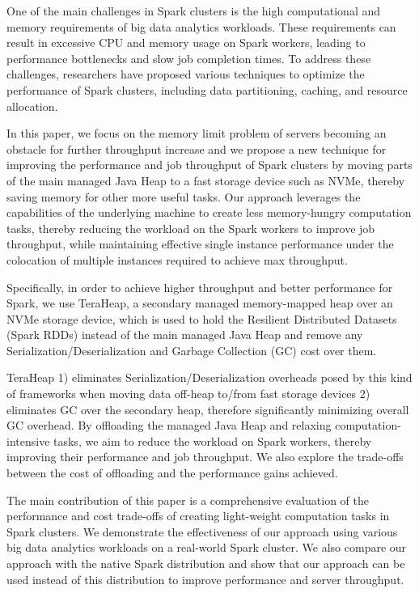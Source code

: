 \documentclass[twocolumn,10pt]{asme2e}
\begin{document}
One of the main challenges in Spark clusters is the high computational and memory requirements of big data analytics workloads. These requirements can result in excessive CPU and memory usage on Spark workers, leading to performance bottlenecks and slow job completion times. To address these challenges, researchers have proposed various techniques to optimize the performance of Spark clusters, including data partitioning, caching, and resource allocation.

In this paper, we focus on the memory limit problem of servers becoming an obstacle for further throughput increase and we propose a new technique for improving the performance and job throughput of Spark clusters by moving parts of the main managed Java Heap to a fast storage device such as NVMe, thereby saving memory for other more useful tasks. Our approach leverages the capabilities of the underlying machine to create less memory-hungry computation tasks, thereby reducing the workload on the Spark workers to improve job throughput, while maintaining effective single instance performance under the colocation of multiple instances required to achieve max throughput.

Specifically, in order to achieve higher throughput and better performance for Spark, we use TeraHeap, a secondary managed memory-mapped heap over an NVMe storage device, which is used to hold the Resilient Distributed Datasets (Spark RDDs) instead of the main managed Java Heap and remove any Serialization/Deserialization and Garbage Collection (GC) cost over them.

TeraHeap 1) eliminates Serialization/Deserialization overheads posed by this kind of frameworks when moving data off-heap to/from fast storage devices 2) eliminates GC over the secondary heap, therefore significantly minimizing overall GC overhead. By offloading the managed Java Heap and relaxing computation-intensive tasks, we aim to reduce the workload on Spark workers, thereby improving their performance and job throughput. We also explore the trade-offs between the cost of offloading and the performance gains achieved.

The main contribution of this paper is a comprehensive evaluation of the performance and cost trade-offs of creating light-weight computation tasks in Spark clusters. We demonstrate the effectiveness of our approach using various big data analytics workloads on a real-world Spark cluster. We also compare our approach with the native Spark distribution and show that our approach can be used instead of this distribution to improve performance and server throughput.
\end{document}
